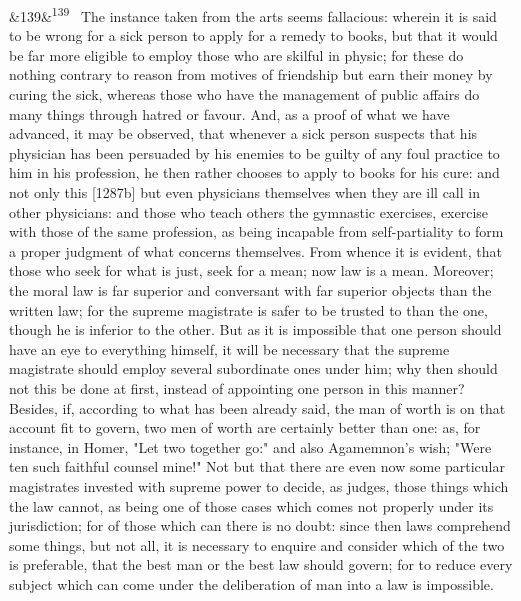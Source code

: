 \documentclass[12pt]{article}
\newcommand{\para}[1][]{\par\noindent\ifx&#1&\else\textsuperscript{\footnotesize #1}~\fi}
\begin{document}
\para[139] The instance taken from the arts seems fallacious: wherein it is said to be wrong for a sick person to apply for a remedy to books, but that it would be far more eligible to employ those who are skilful in physic; for these do nothing contrary to reason from motives of friendship but earn their money by curing the sick, whereas those who have the management of public affairs do many things through hatred or favour. And, as a proof of what we have advanced, it may be observed, that whenever a sick person suspects that his physician has been persuaded by his enemies to be guilty of any foul practice to him in his profession, he then rather chooses to apply to books for his cure: and not only this [1287b] but even physicians themselves when they are ill call in other physicians: and those who teach others the gymnastic exercises, exercise with those of the same profession, as being incapable from self-partiality to form a proper judgment of what concerns themselves. From whence it is evident, that those who seek for what is just, seek for a mean; now law is a mean. Moreover; the moral law is far superior and conversant with far superior objects than the written law; for the supreme magistrate is safer to be trusted to than the one, though he is inferior to the other. But as it is impossible that one person should have an eye to everything himself, it will be necessary that the supreme magistrate should employ several subordinate ones under him; why then should not this be done at first, instead of appointing one person in this manner? Besides, if, according to what has been already said, the man of worth is on that account fit to govern, two men of worth are certainly better than one: as, for instance, in Homer, "Let two together go:" and also Agamemnon's wish; "Were ten such faithful counsel mine!" Not but that there are even now some particular magistrates invested with supreme power to decide, as judges, those things which the law cannot, as being one of those cases which comes not properly under its jurisdiction; for of those which can there is no doubt: since then laws comprehend some things, but not all, it is necessary to enquire and consider which of the two is preferable, that the best man or the best law should govern; for to reduce every subject which can come under the deliberation of man into a law is impossible.
\end{document}
